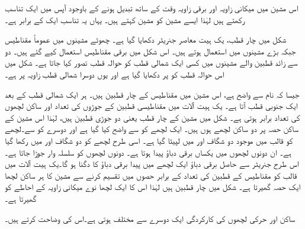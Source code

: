 اس مشین میں  میکانی زاویہ  اور برقی زاویہ   وقت کے ساتھ تبدیل ہونے کے باوجود آپس میں ایک تناسب رکھتے ہیں لہٰذا ایسے مشین کو  مشین  کہتے ہیں۔ یہاں یہ تناسب ایک کے برابر ہے۔ 

شکل   میں چار قطب، یک ہیت معاصر جنریٹر دکھایا گیا ہے۔ چھوٹے مشینوں میں عموماً مقناطیس جبکہ بڑے مشینوں میں  استعمال ہوتے ہیں۔ اس شکل میں  برقی مقناطیس استعمال کیے گئے ہیں۔ دو سے زائد قطبین والے مشینوں میں کسی ایک شمالی قطب کو حوالہ قطب تصور کیا جاتا ہے۔ شکل میں اس حوالہ قطب کو  پر دکھایا گیا ہے اور یوں دوسرا شمالی قطب   زاویہ پر ہے۔

 جیسا کہ نام سے واضح ہے، اس مشین میں  مقناطیس کے چار قطبین  ہیں۔ ہر ایک شمالی قطب کے بعد ایک جنوبی قطب آتا ہے۔ یک ہیت آلات میں مقناطیسی  قطبین کے جوڑوں کی تعداد اور ساکن لچھوں کی تعداد برابر ہوتی ہے۔ شکل   میں  مشین کے چار قطب یعنی دو جوڑی قطبین ہیں،  لہٰذا اس مشین کے ساکن حصہ پر دو ساکن لچھے ہوں ہیں۔ ایک لچھے کو  سے واضح کیا گیا ہے اور دوسرے کو  سے۔لچھے  کو  قالب میں موجود دو شگاف  اور  میں لپیٹا گیا ہے۔ اسی طرح  لچھے کو دو شگاف  اور  میں رکھا گیا ہے۔ ان دونوں لچھوں میں یکساں برقی دباؤ پیدا ہوتا ہے۔  دونوں لچھوں کو سلسلہ وار جوڑا جاتا ہے۔ اس طرح جنریٹر سے حاصل برقی دباؤ ایک لچھے میں پیدا  برقی دباؤ کا دگنا ہو گا۔یک ہیت آلات میں  قالب کو مقناطیس کے  قطبین کی تعداد کے برابر  حصوں میں تقسیم کرنے سے  مشین کا ہر ساکن لچھا ایک حصہ گھیرتا ہے۔ شکل  میں چار  قطبین  ہیں  لہٰذا اس کا ایک لچھا  نوے میکانی زاویہ کے احاطے کو گھیرتا ہے۔

ساکن اور حرکی لچھوں کی کارکردگی ایک دوسرے سے مختلف ہوتی ہے۔اس کی  وضاحت کرتے ہیں۔

